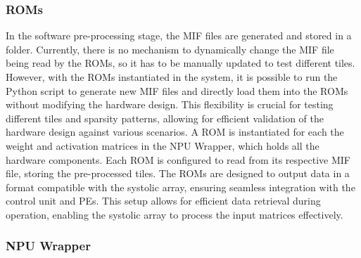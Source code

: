 \documentclass[12pt, a4paper, ukenglish]{article}
\begin{document}
    \subsubsection{ROMs}    \label{sec: roms}
    In the software pre-processing stage, the MIF files are generated and stored in a folder. Currently, there is no mechanism to dynamically change the MIF file being read by the ROMs, so it has to be manually updated to test different tiles. However, with the ROMs instantiated in the system, it is possible to run the Python script to generate new MIF files and directly load them into the ROMs without modifying the hardware design. This flexibility is crucial for testing different tiles and sparsity patterns, allowing for efficient validation of the hardware design against various scenarios.
    A ROM is instantiated for each the weight and activation matrices in the NPU Wrapper, which holds all the hardware components. Each ROM is configured to read from its respective MIF file, storing the pre-processed tiles. The ROMs are designed to output data in a format compatible with the systolic array, ensuring seamless integration with the control unit and PEs. This setup allows for efficient data retrieval during operation, enabling the systolic array to process the input matrices effectively.


    \subsubsection{NPU Wrapper} \label{sec: npu wrapper}
    
\end{document}
